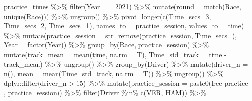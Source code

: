 \documentclass[
]{book}
\newenvironment{Shaded}{\begin{snugshade}}{\end{snugshade}}
\newcommand{\AttributeTok}[1]{\textcolor[rgb]{0.77,0.63,0.00}{#1}}
\newcommand{\DecValTok}[1]{\textcolor[rgb]{0.00,0.00,0.81}{#1}}
\newcommand{\FunctionTok}[1]{\textcolor[rgb]{0.00,0.00,0.00}{#1}}
\newcommand{\NormalTok}[1]{#1}
\newcommand{\SpecialCharTok}[1]{\textcolor[rgb]{0.00,0.00,0.00}{#1}}
\newcommand{\StringTok}[1]{\textcolor[rgb]{0.31,0.60,0.02}{#1}}
\begin{document}
\begin{Shaded}
\begin{Highlighting}[]
\NormalTok{practice\_times }\SpecialCharTok{\%\textgreater{}\%}
  \FunctionTok{filter}\NormalTok{(Year }\SpecialCharTok{==} \DecValTok{2021}\NormalTok{) }\SpecialCharTok{\%\textgreater{}\%} 
  \FunctionTok{mutate}\NormalTok{(}\AttributeTok{round =} \FunctionTok{match}\NormalTok{(Race, }\FunctionTok{unique}\NormalTok{(Race))) }\SpecialCharTok{\%\textgreater{}\%}
  \FunctionTok{ungroup}\NormalTok{() }\SpecialCharTok{\%\textgreater{}\%}
  \FunctionTok{pivot\_longer}\NormalTok{(}\FunctionTok{c}\NormalTok{(Time\_secs\_3, Time\_secs\_2, Time\_secs\_1), }\AttributeTok{names\_to =} \StringTok{\textquotesingle{}practice\_session\textquotesingle{}}\NormalTok{, }\AttributeTok{values\_to =} \StringTok{\textquotesingle{}time\textquotesingle{}}\NormalTok{) }\SpecialCharTok{\%\textgreater{}\%}
  \FunctionTok{mutate}\NormalTok{(}\AttributeTok{practice\_session =} \FunctionTok{str\_remove}\NormalTok{(practice\_session, }\StringTok{\textquotesingle{}Time\_secs\_\textquotesingle{}}\NormalTok{),}
         \AttributeTok{Year =} \FunctionTok{factor}\NormalTok{(Year)) }\SpecialCharTok{\%\textgreater{}\%}
   \FunctionTok{group\_by}\NormalTok{(Race, practice\_session) }\SpecialCharTok{\%\textgreater{}\%}
   \FunctionTok{mutate}\NormalTok{(}\AttributeTok{track\_mean =} \FunctionTok{mean}\NormalTok{(time, }\AttributeTok{na.rm =}\NormalTok{ T),}
          \AttributeTok{Time\_std\_track =}\NormalTok{ time }\SpecialCharTok{{-}}\NormalTok{ track\_mean) }\SpecialCharTok{\%\textgreater{}\%} 
   \FunctionTok{ungroup}\NormalTok{() }\SpecialCharTok{\%\textgreater{}\%} 
   \FunctionTok{group\_by}\NormalTok{(Driver) }\SpecialCharTok{\%\textgreater{}\%} 
   \FunctionTok{mutate}\NormalTok{(}\AttributeTok{driver\_n =} \FunctionTok{n}\NormalTok{(),}
          \AttributeTok{mean =} \FunctionTok{mean}\NormalTok{(Time\_std\_track, }\AttributeTok{na.rm =}\NormalTok{ T)) }\SpecialCharTok{\%\textgreater{}\%}
   \FunctionTok{ungroup}\NormalTok{() }\SpecialCharTok{\%\textgreater{}\%}
\NormalTok{   dplyr}\SpecialCharTok{::}\FunctionTok{filter}\NormalTok{(driver\_n }\SpecialCharTok{\textgreater{}} \DecValTok{15}\NormalTok{) }\SpecialCharTok{\%\textgreater{}\%} 
  \FunctionTok{mutate}\NormalTok{(}\AttributeTok{practice\_session =} \FunctionTok{paste0}\NormalTok{(}\StringTok{\textquotesingle{}free practice \textquotesingle{}}\NormalTok{, practice\_session)) }\SpecialCharTok{\%\textgreater{}\%} 
  \FunctionTok{filter}\NormalTok{(Driver }\SpecialCharTok{\%in\%} \FunctionTok{c}\NormalTok{(}\StringTok{\textquotesingle{}VER\textquotesingle{}}\NormalTok{, }\StringTok{\textquotesingle{}HAM\textquotesingle{}}\NormalTok{)) }\SpecialCharTok{\%\textgreater{}\%}

\end{Highlighting}
\end{Shaded}
\end{document}
